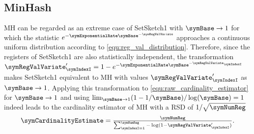 \documentclass[sigconf, nonacm]{acmart}
\begin{document}
\subsection{MinHash}
\label{sec:comp_minhash}
\ac{MH} can be regarded as an extreme case of SetSketch1 with $\symBase\rightarrow 1$ for which the statistic $e^{-\symExponentialRate\symBase^{-\symRegValVariate}}$ approaches a continuous uniform distribution according to \eqref{equ:reg_val_distribution}. Therefore, since the registers of SetSketch1 are also statistically independent, the transformation 
$\symRegValVariate'_\symIndexI = 1 - e^{-\symExponentialRate\symBase^{-\symRegValVariate_\symIndexI}}$
makes SetSketch1 equivalent to \ac{MH} with values $\symRegValVariate'_\symIndexI$ as $\symBase\rightarrow 1$. 
Applying this transformation to \eqref{equ:raw_cardinality_estimator} for $\symBase\rightarrow1$ and using $\lim_{\symBase\rightarrow 1} (1-1/\symBase)/\log(\symBase)=1$ indeed leads to the cardinality estimator of  \ac{MH} \cite{Clifford2012, Cohen2015} with a \ac{RSD} of $1/\sqrt{\symNumReg}$
\begin{equation}
\label{equ:mh_cardinality_estimator}
\textstyle\symCardinalityEstimate = \frac{\symNumReg}{ \sum_{\symIndexI=1}^\symNumReg -\log(1-\symRegValVariate'_\symIndexI)}.
\end{equation}
\end{document}
